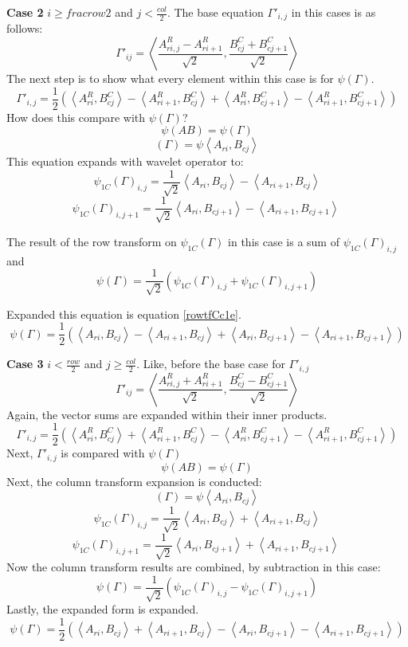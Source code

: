 \textbf{Case 2} $i \geq frac{row}{2}$ and $j <  \frac{col}{2}$.
The base equation $\Gamma'_{i,j}$ in this cases is as follows:
\[ \Gamma'_{ij} = \left\langle \frac {A^R_{ri,j} - A^R_{ri+1}}{\sqrt{2}} , \frac {B^C_{cj} + B^C_{cj + 1}}{\sqrt{2}} \right\rangle  \]
The next step is to show what every element within this case is for $\psi(\Gamma)$.  
\[ \Gamma'_{i,j} = \frac{1}{2} ( \left\langle A^R_{ri}, B^C_{cj}   \right\rangle -   \left\langle A^R_{ri+1}, B^C_{cj}   \right\rangle +  \left\langle A^R_{ri}, B^C_{cj + 1}   \right\rangle -  \left\langle A^R_{ri+1}, B^C_{cj+1}   \right\rangle    ) \]
How does this compare with $\psi (\Gamma)$?
\[ \psi (A B)  = \psi (\Gamma)    \]
\[ (\Gamma) = \psi  \left\langle A_{ri} , B_{cj}  \right\rangle \]
This equation expands with wavelet operator to:
\[ \psi_{1C} (\Gamma)_{i,j} = \frac{1}{\sqrt{2}} \left\langle A_{ri} , B_{cj}  \right\rangle - \left\langle A_{ri +1} , B_{cj}  \right\rangle   \]
\[ \psi_{1C} (\Gamma)_{i,j+1} = \frac{1}{\sqrt{2}} \left\langle A_{ri} , B_{cj+1}  \right\rangle - \left\langle A_{ri +1} , B_{cj+1}  \right\rangle \  \]

The result of the row transform on $\psi_{1C}(\Gamma)$ in this case is a sum of $\psi_{1C}(\Gamma)_{i,j}$ and 
\[ \psi(\Gamma) = \frac{1}{\sqrt {2}} (\psi_{1C} (\Gamma)_{i,j} + \psi_{1C} (\Gamma)_{i,j+1}   ) \]

 Expanded this equation is equation \ref{rowtfCc1e}.
\[ \psi(\Gamma) = \frac{1}{2} (  \left\langle A_{ri} , B_{cj}  \right\rangle - \left\langle A_{ri +1} , B_{cj}  \right\rangle + \left\langle A_{ri} , B_{cj+1}  \right\rangle - \left\langle A_{ri +1} , B_{cj+1}  \right\rangle   ) \]

\textbf {Case 3} $i < \frac {row}{2}$ and $j \ge \frac{col}{2}$.
Like, before the base case for $\Gamma'_{i,j}$
\[ \Gamma'_{ij} = \left\langle \frac {A^R_{ri,j} + A^R_{ri+1}}{\sqrt{2}} , \frac {B^C_{cj} - B^C_{cj + 1}}{\sqrt{2}} \right\rangle  \]
Again, the vector sums are expanded within their inner products.  
\[ \Gamma'_{i,j} = \frac{1}{2} ( \left\langle A^R_{ri}, B^C_{cj}   \right\rangle +   \left\langle A^R_{ri+1}, B^C_{cj}   \right\rangle -  \left\langle A^R_{ri}, B^C_{cj + 1}   \right\rangle -  \left\langle A^R_{ri+1}, B^C_{cj+1}   \right\rangle    ) \]
Next, $\Gamma'_{i,j}$ is compared with $\psi(\Gamma)$
\[ \psi (A B)  = \psi (\Gamma)    \]
Next, the column transform expansion is conducted:
\[ (\Gamma) = \psi  \left\langle A_{ri} , B_{cj}  \right\rangle \]
\[ \psi_{1C} (\Gamma)_{i,j} = \frac{1}{\sqrt{2}} \left\langle A_{ri} , B_{cj}  \right\rangle + \left\langle A_{ri +1} , B_{cj}  \right\rangle   \]
\[ \psi_{1C} (\Gamma)_{i,j+1} = \frac{1}{\sqrt{2}} \left\langle A_{ri} , B_{cj+1}  \right\rangle + \left\langle A_{ri +1} , B_{cj+1}  \right\rangle \  \]
Now the column transform results are combined, by subtraction in this case:
\[ \psi(\Gamma) = \frac{1}{\sqrt {2}} (\psi_{1C} (\Gamma)_{i,j} - \psi_{1C} (\Gamma)_{i,j+1}   ) \]
Lastly, the expanded form is expanded.
\[ \psi(\Gamma) = \frac{1}{2} (  \left\langle A_{ri} , B_{cj}  \right\rangle + \left\langle A_{ri +1} , B_{cj}  \right\rangle - \left\langle A_{ri} , B_{cj+1}  \right\rangle - \left\langle A_{ri +1} , B_{cj+1}  \right\rangle   ) \]

